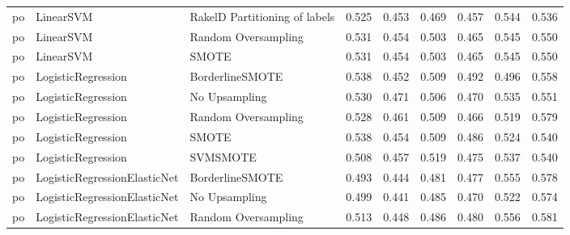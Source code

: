 \begin{tabular}{lllllllll}
      po &                       LinearSVM & RakelD Partitioning of labels & 0.525 &                     0.453 &                 0.469 &                  0.457 &                                   0.544 &     0.536 \\
      po &                       LinearSVM &           Random Oversampling & 0.531 &                     0.454 &                 0.503 &                  0.465 &                                   0.545 &     0.550 \\
      po &                       LinearSVM &                         SMOTE & 0.531 &                     0.454 &                 0.503 &                  0.465 &                                   0.545 &     0.550 \\
      po &              LogisticRegression &               BorderlineSMOTE & 0.538 &                     0.452 &                 0.509 &                  0.492 &                                   0.496 &     0.558 \\
      po &              LogisticRegression &                 No Upsampling & 0.530 &                     0.471 &                 0.506 &                  0.470 &                                   0.535 &     0.551 \\
      po &              LogisticRegression &           Random Oversampling & 0.528 &                     0.461 &                 0.509 &                  0.466 &                                   0.519 &     0.579 \\
      po &              LogisticRegression &                         SMOTE & 0.538 &                     0.454 &                 0.509 &                  0.486 &                                   0.524 &     0.540 \\
      po &              LogisticRegression &                      SVMSMOTE & 0.508 &                     0.457 &                 0.519 &                  0.475 &                                   0.537 &     0.540 \\
      po &    LogisticRegressionElasticNet &               BorderlineSMOTE & 0.493 &                     0.444 &                 0.481 &                  0.477 &                                   0.555 &     0.578 \\
      po &    LogisticRegressionElasticNet &                 No Upsampling & 0.499 &                     0.441 &                 0.485 &                  0.470 &                                   0.522 &     0.574 \\
      po &    LogisticRegressionElasticNet &           Random Oversampling & 0.513 &                     0.448 &                 0.486 &                  0.480 &                                   0.556 &     0.581 \\

\end{tabular}
